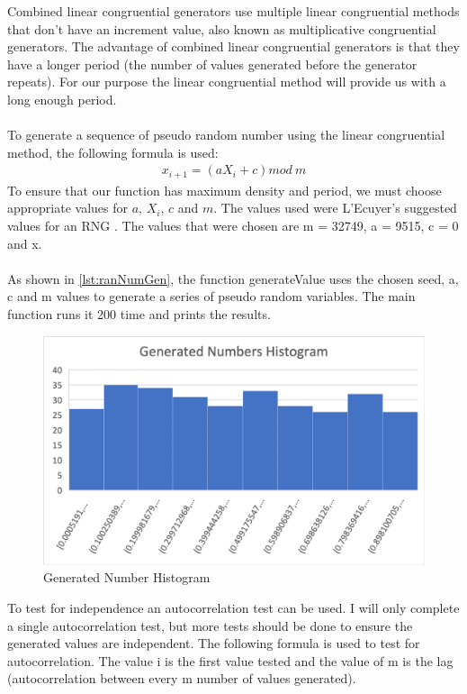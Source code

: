 \documentclass[final, hidelinks, 12pt, a4paper]{article}
\begin{document}
    Combined linear congruential generators use multiple linear congruential methods that don’t have an increment value, also known as multiplicative congruential generators.
    The advantage of combined linear congruential generators is that they have a longer period (the number of values generated before the generator repeats).
    For our purpose the linear congruential method will provide us with a long enough period.\\\\
    To generate a sequence of pseudo random number using the linear congruential method, the following formula is used:
    \begin{align}
        x_{i+1} = (aX_i + c) mod\ m
        \label{eqt:lincon}
    \end{align}
    To ensure that our function has maximum density and period, we must choose appropriate values for $a$, $X_i$, $c$ and $m$.
    The values used were L'Ecuyer's suggested values for an RNG \cite{acc:eu}.
    The values that were chosen are m = 32749, a = 9515, c = 0 and x.\\\\
    As shown in \ref{lst:ranNumGen}, the function generateValue uses the chosen seed, a, c and m values to generate a series of pseudo random variables.
    The main function runs it 200 time and prints the results.
    \begin{figure}[htbp]
        \centering
        \includegraphics[width=\linewidth]{ranNumGen.png}
        \caption{Generated Number Histogram}
        \label{fig:genNumhisto}
    \end{figure}
    To test for independence an autocorrelation test can be used. I will only complete a single autocorrelation test, but more tests should be done to ensure the generated values are independent. The following formula is used to test for autocorrelation. The value i is the first value tested and the value of m is the lag (autocorrelation between every m number of values generated).
    \clearpage
\end{document}
